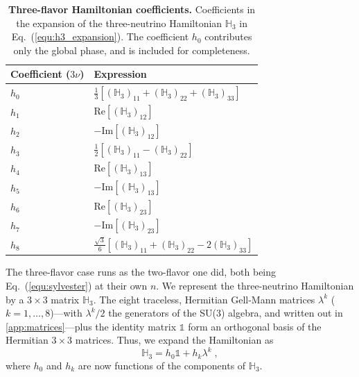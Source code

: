 \documentclass[final,5p,times,twocolumn,sort,compress]{elsarticle}
\newcommand{\eq}{Eq.}
\newcommand{\equ}[1]{\eq~(\ref{equ:#1})}
\begin{document}
{\def\arraystretch{1.2}
\begin{table}[t!]
 \begin{tabular}{ll}
  Coefficient ($3\nu$) & Expression \\
  \hline
  $h_0$ & $\frac{1}{3}\left[\left(\mathbb{H}_3\right)_{11}+\left(\mathbb{H}_3\right)_{22}+\left(\mathbb{H}_3\right)_{33}\right]$ \\
  $h_1$ & $\text{Re}\left[{\left(\mathbb{H}_3\right)_{12}}\right]$ \\
  $h_2$ & $-\text{Im}\left[{\left(\mathbb{H}_3\right)_{12}}\right]$ \\
  $h_3$ & $\frac{1}{2}\left[\left(\mathbb{H}_3\right)_{11}-\left(\mathbb{H}_3\right)_{22} \right]$ \\
  $h_4$ & $\text{Re}\left[{\left(\mathbb{H}_3\right)_{13}}\right]$ \\
  $h_5$ & $-\text{Im}\left[{\left(\mathbb{H}_3\right)_{13}}\right]$ \\
  $h_6$ & $\text{Re}\left[{\left(\mathbb{H}_3\right)_{23}}\right]$ \\
  $h_7$ & $-\text{Im}\left[{\left(\mathbb{H}_3\right)_{23}}\right]$ \\
  $h_8$ & $\frac{\sqrt{3}}{6}\left[\left(\mathbb{H}_3\right)_{11}+\left(\mathbb{H}_3\right)_{22}-2\left(\mathbb{H}_3\right)_{33}\right]$
 \end{tabular}
 \caption{\label{tab:h3_coefficients}{\bf Three-flavor Hamiltonian coefficients.} Coefficients in the expansion of the three-neutrino Hamiltonian $\mathbb{H}_3$ in \equ{h3_expansion}.  The coefficient $h_0$ contributes only the global phase, and is included for completeness.}
\end{table}
}

The three-flavor case runs as the two-flavor one did, both being \equ{sylvester} at their own $n$.  We represent the three-neutrino Hamiltonian by a $3 \times 3$ matrix $\mathbb{H}_3$.  The eight traceless, Hermitian Gell-Mann matrices $\lambda^k$ ($k=1,\ldots,8$)---with $\lambda^k/2$ the generators of the SU(3) algebra, and written out in \ref{app:matrices}---plus the identity matrix $\mathbb{1}$ form an orthogonal basis of the Hermitian $3 \times 3$ matrices.  Thus, we expand the Hamiltonian as
\begin{equation}
 \label{equ:h3_expansion}
 \mathbb{H}_3 = h_0 \mathbb{1} + h_k \lambda^k \;,
\end{equation}
where $h_0$ and $h_k$ are now functions of the components of $\mathbb{H}_3$.
\end{document}
